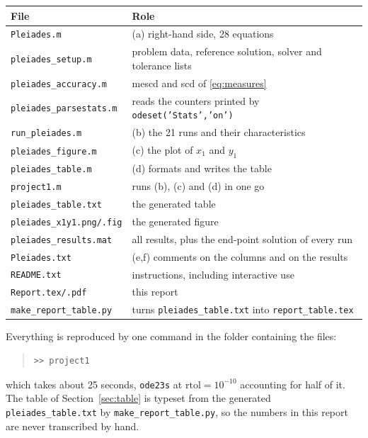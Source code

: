 \documentclass[11pt]{article}
\newcommand{\code}[1]{\texttt{#1}}
\begin{document}
\begin{center}
\small
\begin{tabular}{ll}
\toprule
File & Role \\
\midrule
\code{Pleiades.m}            & (a) right-hand side, 28 equations \\
\code{pleiades\_setup.m}      & problem data, reference solution, solver and tolerance lists \\
\code{pleiades\_accuracy.m}   & mescd and scd of \eqref{eq:measures} \\
\code{pleiades\_parsestats.m} & reads the counters printed by \code{odeset('Stats','on')} \\
\code{run\_pleiades.m}        & (b) the 21 runs and their characteristics \\
\code{pleiades\_figure.m}     & (c) the plot of $x_1$ and $y_1$ \\
\code{pleiades\_table.m}      & (d) formats and writes the table \\
\code{project1.m}            & runs (b), (c) and (d) in one go \\
\midrule
\code{pleiades\_table.txt}    & the generated table \\
\code{pleiades\_x1y1.png/.fig}& the generated figure \\
\code{pleiades\_results.mat}  & all results, plus the end-point solution of every run \\
\code{Pleiades.txt}          & (e,f) comments on the columns and on the results \\
\code{README.txt}            & instructions, including interactive use \\
\code{Report.tex/.pdf}       & this report \\
\code{make\_report\_table.py} & turns \code{pleiades\_table.txt} into \code{report\_table.tex} \\
\bottomrule
\end{tabular}
\end{center}

Everything is reproduced by one command in the folder containing the files:

\begin{quote}
\begin{verbatim}
>> project1
\end{verbatim}
\end{quote}

which takes about 25 seconds, \code{ode23s} at $\text{rtol} = 10^{-10}$ accounting
for half of it. The table of Section~\ref{sec:table} is typeset from the
generated \code{pleiades\_table.txt} by \code{make\_report\_table.py}, so the
numbers in this report are never transcribed by hand.
\end{document}
